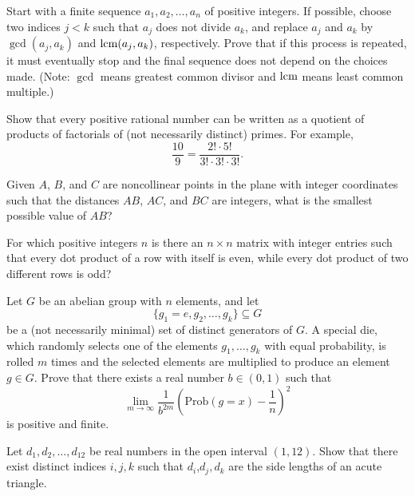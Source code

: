 \documentclass[12pt]{article}
\begin{document}
    \begin{exercise}[2008 A3]
        Start with a finite sequence $a_1,a_2,\dots,a_n$ of positive integers. If possible, choose two indices $j < k$ such that $a_j$ does not divide $a_k$, and replace $a_j$ and $a_k$ by $\gcd(a_j , a_k )$ and $\operatorname*{lcm}(a_j , a_k )$, respectively. Prove that if this process is repeated, it must eventually stop and the final sequence does not depend on the choices made. (Note: $\gcd$ means greatest common divisor and $\operatorname*{lcm}$ means least common multiple.)
    \end{exercise}

    \begin{exercise}[2009 B1]
        Show that every positive rational number can be written as a quotient of products of factorials of (not necessarily distinct) primes.
        For example,
        \[\frac{10}{9} = \frac{2!\cdot 5!}{3!\cdot 3!\cdot 3!}.\]
    \end{exercise}

    \begin{exercise}[2010 B2]
        Given $A$, $B$, and $C$ are noncollinear points in the plane with integer coordinates such that the distances $AB$, $AC$, and $BC$ are integers, what is the smallest possible value of $AB$?
    \end{exercise}

    \begin{exercise}[2011 A4]
        For which positive integers $n$ is there an $n \times n$ matrix with integer entries such that every dot product of a row with itself is even, while every dot product of two different rows is odd?
    \end{exercise}

    \begin{exercise}[2011 A6]
        Let \(G\) be an abelian group with \(n\) elements, and let
        \[\{g_1=e,g_2,\ldots,g_k\}\subseteq G\]
        be a (not necessarily minimal) set of distinct generators of \(G\).
        A special die, which randomly selects one of the elements \(g_1,\ldots,g_k\) with equal probability, is rolled \(m\) times and the selected elements are multiplied to produce an element \(g\in G\).
        Prove that there exists a real number \(b\in(0,1)\) such that
        \[\lim_{m\to\infty}\frac{1}{b^{2m}}\left(\textrm{Prob}(g=x)-\frac{1}{n}\right)^2\]
        is positive and finite.
    \end{exercise}

    \begin{exercise}[2012 A1]
        Let $d_{1}, d_{2}, \ldots, d_{12}$ be real numbers in the open interval $(1, 12)$. Show that there exist distinct indices $i, j, k$ such that $d_{i}$,$d_{j},d_{k}$ are the side lengths of an acute triangle.
    \end{exercise}
\end{document}
